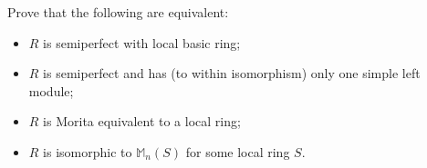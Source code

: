 Prove that the following are equivalent:
\begin{itemize}
\item[(a)] $R$ is semiperfect with local basic ring;
\item[(b)] $R$ is semiperfect and has (to within isomorphism) only one simple left module;
\item[(c)] $R$ is Morita equivalent to a local ring;
\item[(d)] $R$ is isomorphic to $\mathbb{M}_n(S)$ for some local ring $S$.
\end{itemize}
